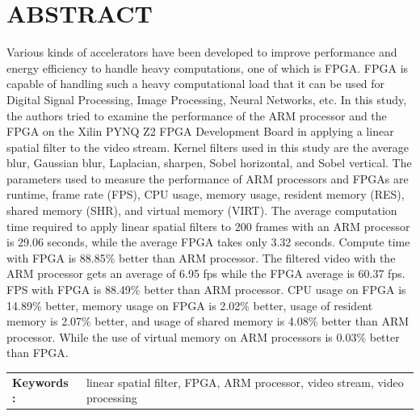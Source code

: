 ﻿\chapter*{ABSTRACT}

Various kinds of accelerators have been developed to improve performance and energy efficiency to handle heavy computations, one of which is FPGA. FPGA is capable of handling such a heavy computational load that it can be used for Digital Signal Processing, Image Processing, Neural Networks, etc. In this study, the authors tried to examine the performance of the ARM processor and the FPGA on the Xilin PYNQ Z2 FPGA Development Board in applying a linear spatial filter to the video stream. Kernel filters used in this study are the average blur, Gaussian blur, Laplacian, sharpen, Sobel horizontal, and Sobel vertical. The parameters used to measure the performance of ARM processors and FPGAs are runtime, frame rate (FPS), CPU usage, memory usage, resident memory (RES), shared memory (SHR), and virtual memory (VIRT). The average computation time required to apply linear spatial filters to 200 frames with an ARM processor is 29.06 seconds, while the average FPGA takes only 3.32 seconds. Compute time with FPGA is 88.85\% better than ARM processor. The filtered video with the ARM processor gets an average of 6.95 fps while the FPGA average is 60.37 fps. FPS with FPGA is 88.49\% better than ARM processor. CPU usage on FPGA is 14.89\% better, memory usage on FPGA is 2.02\% better, usage of resident memory is 2.07\% better, and usage of shared memory is 4.08\% better than ARM processor. While the use of virtual memory on ARM processors is 0.03\% better than FPGA. 


\begin{table}[h]
    \begin{tabular}{ p{} p{} }
        \\
        \textbf{Keywords :} & linear spatial filter, FPGA, ARM processor, video stream, video processing
    \end{tabular}
\end{table}
